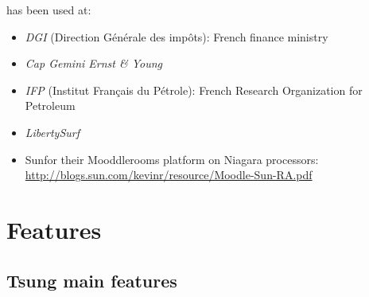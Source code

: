 \documentclass{IDXDOC-en}
\begin{document}
 has been used  at:

\begin{itemize}
\item \emph{DGI} (Direction Générale des impôts): French finance ministry
\item \emph{Cap Gemini Ernst \& Young}
\item \emph{IFP} (Institut Français du Pétrole): French Research Organization
for Petroleum
\item \emph{LibertySurf}
\item Sun\texttrademark for their Mooddlerooms platform on Niagara processors:
 \url{http://blogs.sun.com/kevinr/resource/Moodle-Sun-RA.pdf}
\end{itemize}


\section{Features}

\subsection{Tsung main features}
\end{document}
